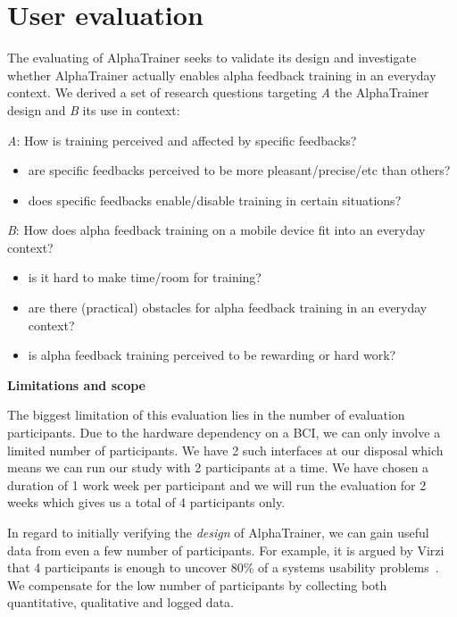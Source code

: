 \documentclass[a4paper,10pt,english,lof,lot,twoside]{puthesis}
\begin{document}
\chapter{User evaluation}
\label{ch-evaluation/index::doc}\label{ch-evaluation/index:ch-evaluation}\label{ch-evaluation/index:user-evaluation}
The evaluating of AlphaTrainer seeks to validate its design and investigate whether AlphaTrainer actually enables alpha feedback training in an everyday context. We derived a set of research questions targeting \emph{A} the AlphaTrainer design and \emph{B} its use in context:

\emph{A}: How is training perceived and affected by specific feedbacks?
\begin{itemize}
\item {} 
are specific feedbacks perceived to be more pleasant/precise/etc than others?

\item {} 
does specific feedbacks enable/disable training in certain situations?

\end{itemize}

\emph{B}: How does alpha feedback training on a mobile device fit into an everyday context?
\begin{itemize}
\item {} 
is it hard to make time/room for training?

\item {} 
are there (practical) obstacles for alpha feedback training in an everyday context?

\item {} 
is alpha feedback training perceived to be rewarding or hard work?

\end{itemize}

\textbf{Limitations and scope}

The biggest limitation of this evaluation lies in the number of evaluation participants. Due to the hardware dependency on a BCI, we can only involve a limited number of participants. We have 2 such interfaces at our disposal which means we can run our study with 2 participants at a time. We have chosen a duration of 1 work week per participant and we will run the evaluation for 2 weeks which gives us a total of 4 participants only.

In regard to initially verifying the \emph{design} of AlphaTrainer, we can gain useful data from even a few number of participants. For example, it is argued by Virzi that 4 participants is enough to uncover 80\% of a systems usability problems \cite{virzi_refining_1992}. We compensate for the low number of participants by collecting both quantitative, qualitative and logged data.
\end{document}
